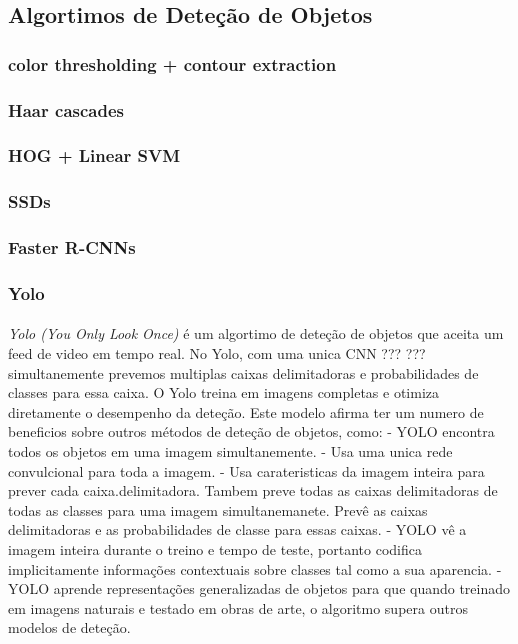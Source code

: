 \subsection{Algortimos de Deteção de Objetos}
\label{chap2:subsec:algoritmosdetecao}

\subsubsection{color thresholding + contour extraction}

\subsubsection{Haar cascades}

\subsubsection{HOG + Linear SVM}

\subsubsection{SSDs}

\subsubsection{Faster R-CNNs}

\subsubsection{Yolo}
\paragraph{}
\textit{Yolo (You Only Look Once)} é um algortimo de deteção de objetos que aceita um feed de video em tempo real.
No Yolo, com uma unica CNN ??? ??? simultanemente prevemos multiplas caixas delimitadoras e probabilidades de classes para essa caixa. O Yolo treina em imagens completas e otimiza diretamente o desempenho da deteção. Este modelo afirma ter um numero de beneficios sobre outros métodos de deteção de objetos, como:
\newline - YOLO encontra todos os objetos em uma imagem simultanemente.
\newline - Usa uma unica rede convulcional para toda a imagem.
\newline - Usa carateristicas da imagem inteira para prever cada caixa.delimitadora. Tambem preve todas as caixas delimitadoras de todas as classes para uma imagem simultanemanete. Prevê as caixas delimitadoras e as probabilidades de classe para essas caixas.
\newline - YOLO vê a imagem inteira durante o treino e tempo de teste, portanto codifica implicitamente informações contextuais sobre classes tal como a sua aparencia.
\newline - YOLO aprende representações generalizadas de objetos para que quando treinado em imagens naturais e testado em obras de arte, o algoritmo supera outros modelos de deteção.

